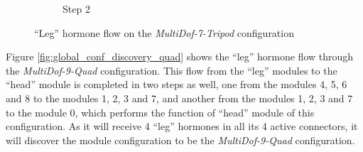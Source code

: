 \begin{figure}[h]
\begin{subfigure}[r]{0.45\textwidth}
                \caption{Step 2}
                \label{fig:tripod_step2}
        \end{subfigure}
        \caption{``Leg'' hormone flow on the \emph{MultiDof-7-Tripod} configuration}\label{fig:global_conf_discovery_tripod}
\end{figure}

Figure \ref{fig:global_conf_discovery_quad} shows the ``leg'' hormone flow through the \emph{MultiDof-9-Quad} configuration. This flow from the ``leg'' modules to the ``head'' module is completed in two steps as well, one from the modules 4, 5, 6 and 8 to the modules 1, 2, 3 and 7, and another from the modules 1, 2, 3 and 7 to the module 0, which performs the function of ``head'' module of this configuration. As it will receive 4 ``leg'' hormones in all its 4 active connectors, it will discover the module configuration to be the \emph{MultiDof-9-Quad} configuration.\\
